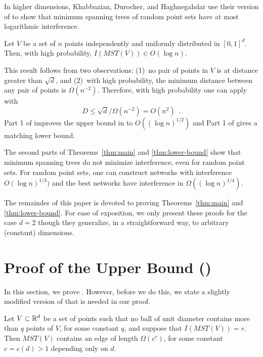 \documentclass{patmorin}
\newcommand{\mst}{\mathit{MST}}
\begin{document}
In higher dimensions, Khabbazian, Durocher, and Haghnegahdar \cite{kdh11}
use their version of  to show that minimum spanning trees
of random point sets have at most logarithmic interference.
\begin{thm}
  Let $V$ be a set of $n$ points independently and uniformly distributed
  in $[0,1]^d$.  Then, with high probability, $I(\mst(V))\in O(\log n)$.
\end{thm}
This result follows from two observations: (1)~no pair of points in $V$
is at distance greater than $\sqrt{d}$, and (2)~with high probability,
the minimum distance between any pair of points is $\Omega(n^{-2})$.  Therefore,
with high probability one can apply  with 
\[
   D \le \sqrt{d}/\Omega(n^{-2}) = O(n^2) \enspace .
\]
Part 1 of  improves the upper bound in  to
$O((\log n)^{1/2})$ and Part 1 of  gives a matching
lower bound.

The second parts of Theorems~\ref{thm:main} and \ref{thm:lower-bound}
show that minimum spanning trees do not minimize interference, even for
random point sets.  For random point sets, one can construct networks with
interference $O(\log n)^{1/3})$ and the best networks have interference
in $\Omega((\log n)^{1/4})$.

The remainder of this paper is devoted to proving Theorems~\ref{thm:main}
and \ref{thm:lower-bound}.  For ease of exposition, we only present these
proofs for the case $d=2$ though they generalize, in a straightforward
way, to arbitrary (constant) dimensions.

\section{Proof of the Upper Bound ()}

In this section, we prove .  However, before we do this,
we state a slightly modified version of  that is needed in
our proof.

\begin{lem}
  Let $V\subset\mathbb{R}^d$ be a set of points such that no ball of unit
  diameter contains more than $q$ points of $V$, for some constant $q$,
  and suppose that $I(MST(V))=r$.  Then $MST(V)$
  contains an edge of length $\Omega(c^r)$, for some constant $c=c(d)>1$
  depending only on $d$.
\end{lem}
\end{document}

